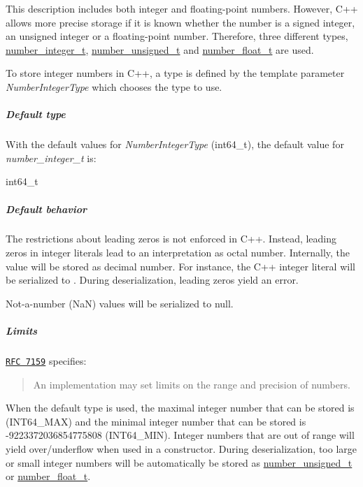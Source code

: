 This description includes both integer and floating-\/point numbers. However, C++ allows more precise storage if it is known whether the number is a signed integer, an unsigned integer or a floating-\/point number. Therefore, three different types, \hyperlink{classnlohmann_1_1basic__json_ac4b10b2364f26ce47bdb9a413ff04a59}{number\-\_\-integer\-\_\-t}, \hyperlink{classnlohmann_1_1basic__json_a60a04166c122072ab11eaf9845d9cd1d}{number\-\_\-unsigned\-\_\-t} and \hyperlink{classnlohmann_1_1basic__json_a74a0013e847fdc574b48f931f0e757e1}{number\-\_\-float\-\_\-t} are used.

To store integer numbers in C++, a type is defined by the template parameter {\itshape Number\-Integer\-Type} which chooses the type to use.

\subparagraph*{Default type}

With the default values for {\itshape Number\-Integer\-Type} ({\ttfamily int64\-\_\-t}), the default value for {\itshape number\-\_\-integer\-\_\-t} is\-:


\begin{DoxyCode}
int64\_t
\end{DoxyCode}


\subparagraph*{Default behavior}


\begin{DoxyItemize}
\item The restrictions about leading zeros is not enforced in C++. Instead, leading zeros in integer literals lead to an interpretation as octal number. Internally, the value will be stored as decimal number. For instance, the C++ integer literal {} will be serialized to {}. During deserialization, leading zeros yield an error.
\item Not-\/a-\/number (Na\-N) values will be serialized to {\ttfamily null}.
\end{DoxyItemize}

\subparagraph*{Limits}

\href{http://rfc7159.net/rfc7159}{\tt R\-F\-C 7159} specifies\-: \begin{quotation}
An implementation may set limits on the range and precision of numbers.

\end{quotation}


When the default type is used, the maximal integer number that can be stored is {} (I\-N\-T64\-\_\-\-M\-A\-X) and the minimal integer number that can be stored is {\ttfamily -\/9223372036854775808} (I\-N\-T64\-\_\-\-M\-I\-N). Integer numbers that are out of range will yield over/underflow when used in a constructor. During deserialization, too large or small integer numbers will be automatically be stored as \hyperlink{classnlohmann_1_1basic__json_a60a04166c122072ab11eaf9845d9cd1d}{number\-\_\-unsigned\-\_\-t} or \hyperlink{classnlohmann_1_1basic__json_a74a0013e847fdc574b48f931f0e757e1}{number\-\_\-float\-\_\-t}.

